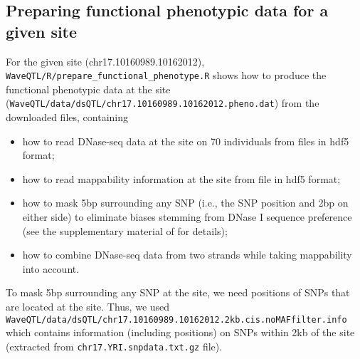 \documentclass[11pt]{article}
\begin{document}
\subsection{Preparing functional phenotypic data for a given site}\label{pheno}
For the given site (chr17.10160989.10162012), {\tt WaveQTL/R/prepare\_functional\_phenotype.R} shows how to produce the functional phenotypic data at the site \\({\tt WaveQTL/data/dsQTL/chr17.10160989.10162012.pheno.dat}) from the downloaded files, containing
\begin{itemize}
\item how to read DNase-seq data at the site on 70 individuals from files in hdf5 format;
\item how to read mappability information at the site from file in hdf5 format;
\item how to mask 5bp surrounding any SNP (i.e., the SNP position and 2bp on either side) to eliminate biases stemming from DNase I sequence preference (see the supplementary material of \cite{Degner_2012} for details);
\item how to combine DNase-seq data from two strands while taking mappability into account.
\end{itemize}
To mask 5bp surrounding any SNP at the site, we need positions of SNPs that are located at the site. Thus, we used {\tt WaveQTL/data/dsQTL/chr17.10160989.10162012.2kb.cis.noMAFfilter.info} which contains information (including positions) on SNPs within 2kb of the site (extracted from {\tt chr17.YRI.snpdata.txt.gz} file).






\end{document}
